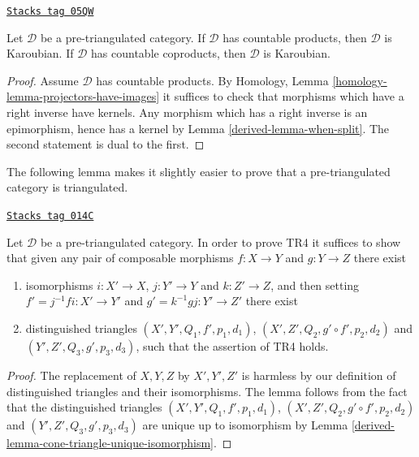 \begin{lemma}
\label{derived-lemma-projectors-have-images-triangulated}
\href{https://stacks.math.columbia.edu/tag/05QW}{\texttt{Stacks tag 05QW}}

Let $\mathcal{D}$ be a pre-triangulated category.
If $\mathcal{D}$ has countable products, then $\mathcal{D}$
is Karoubian.
If $\mathcal{D}$ has countable coproducts, then $\mathcal{D}$
is Karoubian.
\end{lemma}

\begin{proof}

Assume $\mathcal{D}$ has countable products. By
Homology, Lemma \ref{homology-lemma-projectors-have-images}
it suffices to check that morphisms which have a right inverse have kernels.
Any morphism which has a right inverse is an epimorphism, hence
has a kernel by
Lemma \ref{derived-lemma-when-split}.
The second statement is dual to the first.
\end{proof}

The following lemma makes it slightly easier to prove that a
pre-triangulated category is triangulated.

\begin{lemma}
\label{derived-lemma-easier-axiom-four}
\href{https://stacks.math.columbia.edu/tag/014C}{\texttt{Stacks tag 014C}}

Let $\mathcal{D}$ be a pre-triangulated category.
In order to prove TR4 it suffices to show that given
any pair of composable morphisms
$f : X \to Y$ and $g : Y \to Z$ there exist
\begin{enumerate}
\item isomorphisms $i : X' \to X$, $j : Y' \to Y$ and
$k : Z' \to Z$, and then setting $f' = j^{-1}fi : X' \to Y'$ and
$g' = k^{-1}gj : Y' \to Z'$ there exist
\item distinguished triangles
$(X', Y', Q_1, f', p_1, d_1)$,
$(X', Z', Q_2, g' \circ f', p_2, d_2)$
and
$(Y', Z', Q_3, g', p_3, d_3)$,
such that the assertion of TR4 holds.
\end{enumerate}
\end{lemma}

\begin{proof}

The replacement of $X, Y, Z$ by $X', Y', Z'$ is harmless by our
definition of distinguished triangles and their isomorphisms.
The lemma follows from the fact that the distinguished triangles
$(X', Y', Q_1, f', p_1, d_1)$,
$(X', Z', Q_2, g' \circ f', p_2, d_2)$
and
$(Y', Z', Q_3, g', p_3, d_3)$
are unique up to isomorphism by
Lemma \ref{derived-lemma-cone-triangle-unique-isomorphism}.
\end{proof}

